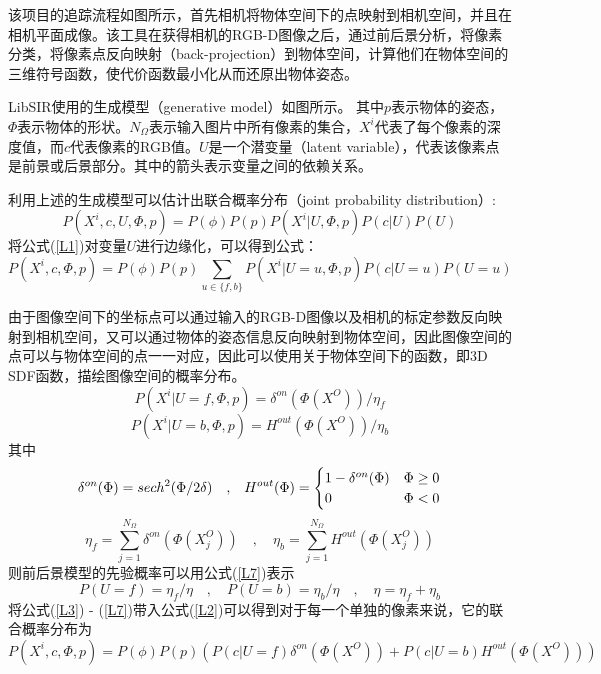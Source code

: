 该项目的追踪流程如图所示，首先相机将物体空间下的点映射到相机空间，并且在相机平面成像。该工具在获得相机的RGB-D图像之后，通过前后景分析，将像素分类，将像素点反向映射（back-projection）到物体空间，计算他们在物体空间的三维符号函数，使代价函数最小化从而还原出物体姿态。

LibSIR使用的生成模型（generative model）如图所示。
其中$p$表示物体的姿态，$\Phi$表示物体的形状。$N_\Omega$表示输入图片中所有像素的集合，$X^i$代表了每个像素的深度值，而$c$代表像素的RGB值。$U$是一个潜变量（latent variable），代表该像素点是前景或后景部分。其中的箭头表示变量之间的依赖关系。

利用上述的生成模型可以估计出联合概率分布（joint probability distribution）:
\begin{equation}
 P(X^i, c, U, \Phi, p) = P(\phi)P(p)P(X^i|U, \Phi, p)P(c|U)P(U)\label{L1}
\end{equation}
将公式(\ref{L1})对变量$U$进行边缘化，可以得到公式：
\begin{equation}
 P(X^i, c, \Phi, p) = P(\phi)P(p)\sum_{u\in\{f,b\}}P(X^i|U=u, \Phi, p)P(c|U=u)P(U=u)\label{L2}
\end{equation}

由于图像空间下的坐标点可以通过输入的RGB-D图像以及相机的标定参数反向映射到相机空间，又可以通过物体的姿态信息反向映射到物体空间，因此图像空间的点可以与物体空间的点一一对应，因此可以使用关于物体空间下的函数，即3D SDF函数，描绘图像空间的概率分布。
\begin{equation}
 P(X^i|U=f, \Phi, p)=\delta^{on}(\Phi(X^O))/\eta_f\label{L3}
\end{equation}
\begin{equation}
 P(X^i|U=b, \Phi, p)=H^{out}(\Phi(X^O))/\eta_b\label{L4}
\end{equation}
其中
\begin{equation} \label{L5}
 \delta^{on}(\Phi)=sech^2(\Phi/2\delta) \quad\mathrm{,}\quad
 H^{out}(\Phi)=
 \begin{cases}
    1-\delta^{on}(\Phi) &\Phi\geq0\cr
    0 &\Phi<0
\end{cases}
\end{equation}
\begin{equation}\label{L6}
 \eta_f=\sum_{j=1}^{N_\Omega}\delta^{on}(\Phi(X_j^O))
\quad\mathrm{,}\quad
 \eta_b=\sum_{j=1}^{N_\Omega}H^{out}(\Phi(X_j^O))
\end{equation}
则前后景模型的先验概率可以用公式(\ref{L7})表示
\begin{equation}\label{L7}
 P(U=f)=\eta_f/\eta \quad\mathrm{,}\quad  P(U=b)=\eta_b/\eta \quad\mathrm{,}\quad  \eta=\eta_f+\eta_b
\end{equation}
将公式(\ref{L3}) - (\ref{L7})带入公式(\ref{L2})可以得到对于每一个单独的像素来说，它的联合概率分布为
\begin{equation}\label{L8}
 P(X^i, c, \Phi, p) = P(\phi)P(p)(P(c|U=f)\delta^{on}(\Phi(X^O)) + P(c|U=b)H^{out}(\Phi(X^O)))
\end{equation}

